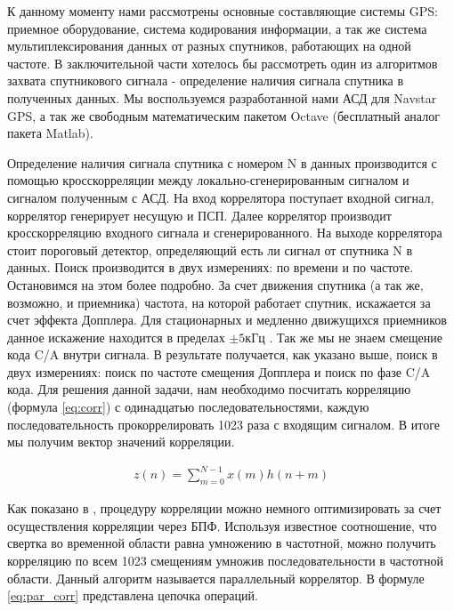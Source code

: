 \documentclass[a4paper,12pt]{article}
\numberwithin{table}{section}
\begin{document}
К данному моменту нами рассмотрены основные составляющие системы GPS: приемное оборудование, система кодирования информации,
а так же система мультиплексирования данных от разных спутников, работающих на одной частоте. В заключительной части хотелось
бы рассмотреть один из алгоритмов захвата спутникового сигнала - определение наличия сигнала спутника 
в полученных данных. Мы воспользуемся разработанной нами АСД для Navstar GPS, а так же
свободным математическим пакетом Octave (бесплатный аналог пакета Matlab).

Определение наличия сигнала спутника с номером N в данных производится с помощью кросскорреляции между локально-сгенерированным
сигналом и сигналом полученным с АСД. На вход коррелятора поступает входной
сигнал, коррелятор генерирует несущую и ПСП. Далее коррелятор производит кросскорреляцию входного сигнала и сгенерированного. 
На выходе коррелятора стоит пороговый детектор, определяющий есть ли сигнал от спутника N в данных. Поиск производится в 
двух измерениях: по времени и по частоте. Остановимся на этом более подробно. За счет движения спутника (а так же, возможно,
и приемника) частота, на которой работает спутник, искажается за счет эффекта Допплера. Для стационарных и медленно движущихся
приемников данное искажение находится в  пределах ${\pm{5 \mbox{кГц}}}$ \cite{tsui}. Так же мы не знаем смещение кода C/A
внутри сигнала. В результате получается, как указано выше, поиск в двух измерениях: поиск по частоте смещения Допплера и
поиск по фазе C/A кода. Для решения данной задачи, нам необходимо посчитать корреляцию (формула \ref{eq:corr}) с одинадцатью
последовательностями, каждую последовательность прокоррелировать 1023 раза с входящим сигналом.
В итоге мы получим вектор значений корреляции.

\begin{eqnarray}
	z(n) = \sum_{m=0}^{N-1}{x(m)h(n+m)}
\label{eq:corr}
\end{eqnarray}

Как показано в \cite{oppenheim, tsui}, процедуру корреляции можно немного оптимизировать за счет осуществления корреляции через
БПФ. Используя известное соотношение, что свертка во временной области равна умножению в частотной, можно получить корреляцию по
всем 1023 смещениям умножив последовательности в частотной области. Данный алгоритм называется параллельный коррелятор.
В формуле \ref{eq:par_corr} представлена цепочка операций.
\end{document}
